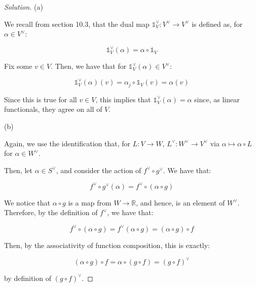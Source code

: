 \documentclass[10pt]{article}
\begin{document}
\begin{proof}[Solution]

(a)

We recall from section 10.3, that the dual map $\mathds{1}_V^\vee: V^\vee \to V^\vee$ is defined as, for $\alpha \in V^\vee$:

$$\mathds{1}_V^\vee(\alpha) = \alpha \circ \mathds{1}_V $$


Fix some $v \in V$. Then, we have that for $\mathds{1}_V^\vee(\alpha) \in V^\vee$:

$$\mathds{1}_V^\vee(\alpha) (v) = \alpha_j \circ \mathds{1}_V(v) = \alpha(v)$$


Since this is true for all $v \in V$, this implies that $\mathds{1}_V^\vee(\alpha) = \alpha$ since, as linear functionals, they agree on all of $V$.

(b)

Again, we use the identification that, for $L: V \to W$, $L^\vee: W^\vee \to V^\vee$ via $\alpha \mapsto \alpha \circ L$ for $\alpha \in W^\vee$.

Then, let $\alpha \in S^\vee$, and consider the action of $f^\vee \circ g^\vee$. We have that:

$$f^\vee \circ g^\vee (\alpha) = f^\vee \circ (\alpha \circ g) $$

We notice that $\alpha \circ g$ is a map from $W \to \mathbb{R}$, and hence, is an element of $W^\vee$. Therefore, by the definition of $f^\vee$, we have that:

$$  f^\vee \circ (\alpha \circ g) = f^\vee(\alpha \circ g) = (\alpha \circ g) \circ f$$

Then, by the associativity of function composition, this is exactly:

$$(\alpha \circ g) \circ f = \alpha \circ (g \circ f ) = (g \circ f)^\vee$$

by definition of $(g \circ f)^\vee$. 


\end{proof}
\end{document}
